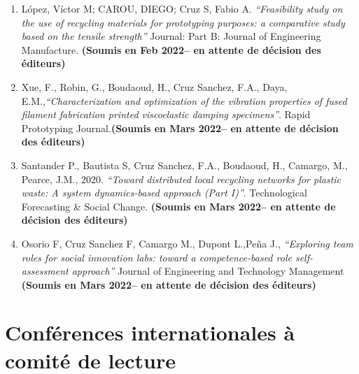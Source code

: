 \documentclass[
  12pt,
  oneside]{book}
\begin{document}
\begin{enumerate}
\def\labelenumi{\arabic{enumi}.}
\item
  López, Víctor M; CAROU, DIEGO; Cruz S, Fabio A. \emph{``Feasibility study on the use of recycling materials for prototyping purposes: a comparative study based on the tensile strength''} Journal: Part B: Journal of Engineering Manufacture. \textbf{(Soumis en Feb 2022-- en attente de décision des éditeurs)}
\item
  Xue, F., Robin, G., Boudaoud, H., Cruz Sanchez, F.A., Daya, E.M.,\emph{``Characterization and optimization of the vibration properties of fused filament fabrication printed viscoelastic damping specimens''}. Rapid Prototyping Journal.\textbf{(Soumis en Mars 2022-- en attente de décision des éditeurs)}
\item
  Santander P., Bautista S, Cruz Sanchez, F.A., Boudaoud, H., Camargo, M., Pearce, J.M., 2020. \emph{``Toward distributed local recycling networks for plastic waste: A system dynamics-based approach (Part I)''}. Technological Forecasting \& Social Change. \textbf{(Soumis en Mars 2022-- en attente de décision des éditeurs)}
\item
  Osorio F, Cruz Sanchez F, Camargo M., Dupont L.,Peña J., \emph{``Exploring team roles for social innovation labs: toward a competence-based role self-assessment approach''} Journal of Engineering and Technology Management \textbf{(Soumis en Mars 2022-- en attente de décision des éditeurs)}
\end{enumerate}

\hypertarget{confuxe9rences-internationales-uxe0-comituxe9-de-lecture}{%
\section{Conférences internationales à comité de lecture}\label{confuxe9rences-internationales-uxe0-comituxe9-de-lecture}}
\end{document}
